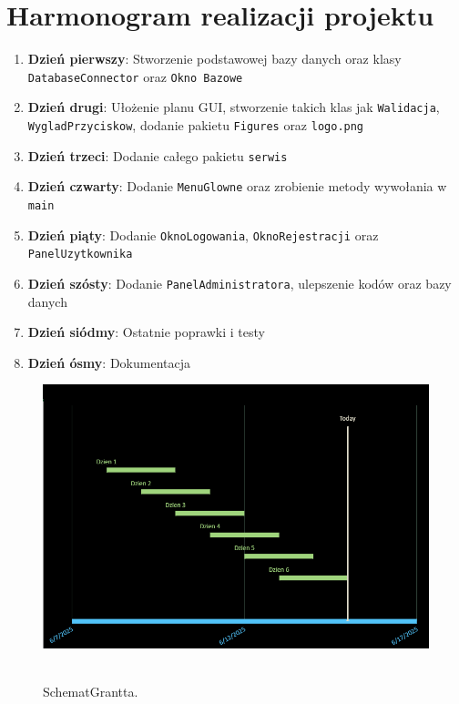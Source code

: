 \chapter{Harmonogram realizacji projektu}
\label{chap:Harmonogram realizacji projektu}

\begin{enumerate}
    \item \textbf{Dzień pierwszy}: Stworzenie podstawowej bazy danych oraz klasy \texttt{DatabaseConnector} oraz \texttt{Okno Bazowe}
    
    \item \textbf{Dzień drugi}: Ułożenie planu GUI, stworzenie takich klas jak \texttt{Walidacja}, \texttt{WygladPrzyciskow}, dodanie pakietu \texttt{Figures} oraz \texttt{logo.png}
    
    \item \textbf{Dzień trzeci}: Dodanie całego pakietu \texttt{serwis}
    
    \item \textbf{Dzień czwarty}: Dodanie \texttt{MenuGlowne} oraz zrobienie metody wywołania w \texttt{main}
    
    \item \textbf{Dzień piąty}: Dodanie \texttt{OknoLogowania}, \texttt{OknoRejestracji} oraz \texttt{PanelUzytkownika}
    
    \item \textbf{Dzień szósty}: Dodanie \texttt{PanelAdministratora}, ulepszenie kodów oraz bazy danych
    
    \item \textbf{Dzień siódmy}: Ostatnie poprawki i testy
    
    \item \textbf{Dzień ósmy}: Dokumentacja
\end{enumerate}

\begin{figure}[H]
    \centering
    \includegraphics[width=.9\linewidth]{figures/SchematGrantta.png}\
    \caption{SchematGrantta.\label{SchematGrantta}}
\end{figure}

